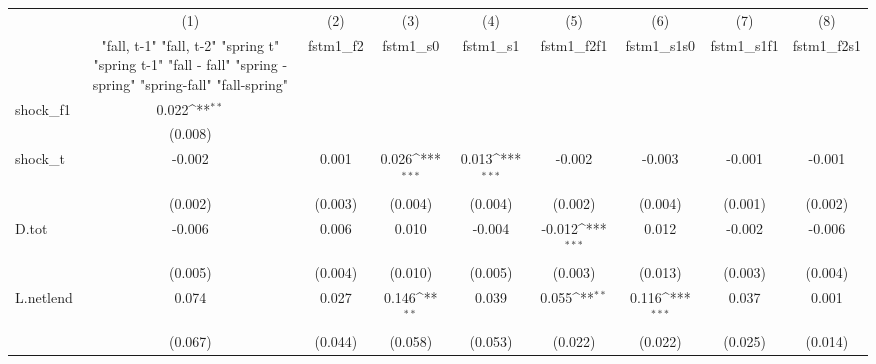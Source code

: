 {
\def\sym#1{\ifmmode^{#1}\else\(^{#1}\)\fi}
\begin{tabular}{l*{8}{c}}
\toprule
            &\multicolumn{1}{c}{(1)}&\multicolumn{1}{c}{(2)}&\multicolumn{1}{c}{(3)}&\multicolumn{1}{c}{(4)}&\multicolumn{1}{c}{(5)}&\multicolumn{1}{c}{(6)}&\multicolumn{1}{c}{(7)}&\multicolumn{1}{c}{(8)}\\
            &\multicolumn{1}{c}{  "fall, t-1" "fall, t-2" "spring t" "spring t-1"  "fall - fall" "spring - spring" "spring-fall" "fall-spring" }&\multicolumn{1}{c}{fstm1\_f2}&\multicolumn{1}{c}{fstm1\_s0}&\multicolumn{1}{c}{fstm1\_s1}&\multicolumn{1}{c}{fstm1\_f2f1}&\multicolumn{1}{c}{fstm1\_s1s0}&\multicolumn{1}{c}{fstm1\_s1f1}&\multicolumn{1}{c}{fstm1\_f2s1}\\
\midrule
shock\_f1    &       0.022\sym{**} &                     &                     &                     &                     &                     &                     &                     \\
            &     (0.008)         &                     &                     &                     &                     &                     &                     &                     \\
\addlinespace
shock\_t     &      -0.002         &       0.001         &       0.026\sym{***}&       0.013\sym{***}&      -0.002         &      -0.003         &      -0.001         &      -0.001         \\
            &     (0.002)         &     (0.003)         &     (0.004)         &     (0.004)         &     (0.002)         &     (0.004)         &     (0.001)         &     (0.002)         \\
\addlinespace
D.tot       &      -0.006         &       0.006         &       0.010         &      -0.004         &      -0.012\sym{***}&       0.012         &      -0.002         &      -0.006         \\
            &     (0.005)         &     (0.004)         &     (0.010)         &     (0.005)         &     (0.003)         &     (0.013)         &     (0.003)         &     (0.004)         \\
\addlinespace
L.netlend   &       0.074         &       0.027         &       0.146\sym{**} &       0.039         &       0.055\sym{**} &       0.116\sym{***}&       0.037         &       0.001         \\
            &     (0.067)         &     (0.044)         &     (0.058)         &     (0.053)         &     (0.022)         &     (0.022)         &     (0.025)         &     (0.014)         \\

\end{tabular}}
